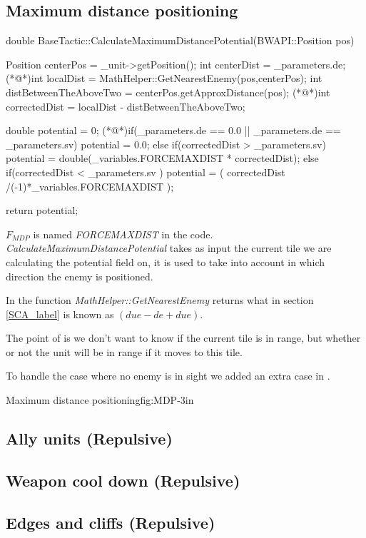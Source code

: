 	\subsection{Maximum distance positioning}
		\begin{Sourcecode}[caption=Maximum distance]
double BaseTactic::CalculateMaximumDistancePotential(BWAPI::Position pos)
{
	Position centerPos = _unit->getPosition();
	int centerDist = _parameters.de;
	(*@\lnote@*)int localDist = MathHelper::GetNearestEnemy(pos,centerPos);
	int distBetweenTheAboveTwo = centerPos.getApproxDistance(pos);
	(*@\lnote@*)int correctedDist = localDist - distBetweenTheAboveTwo;

	double potential = 0;
	(*@\lnote@*)if(_parameters.de == 0.0 || _parameters.de == _parameters.sv)
		potential = 0.0;
	else if(correctedDist > _parameters.sv)
		potential = double(_variables.FORCEMAXDIST * correctedDist);
	else if(correctedDist < _parameters.sv )
		potential = ( correctedDist /(-1)*_variables.FORCEMAXDIST );
		
	return potential;
}
\end{Sourcecode}
	$F_{MDP}$ is named \textit{FORCEMAXDIST} in the code.
	\textit{CalculateMaximumDistancePotential} takes as input the current tile we are calculating the potential field on, it is used to take into account in which direction the enemy is positioned.
	
	In  the function \textit{MathHelper::GetNearestEnemy} returns what in section \ref{SCA_label} is known as $(due - de + due)$.
	
	The point of  is we don't want to know if the current tile is in range, but whether or not the unit will be in range if it moves to this tile.
	
	To handle the case where no enemy is in sight we added an extra case in .
	
			{Maximum distance positioning}{fig:MDP}{-3in}
		
	\subsection{Ally units (Repulsive)}
	\subsection{Weapon cool down (Repulsive)}
	\subsection{Edges and cliffs (Repulsive)}